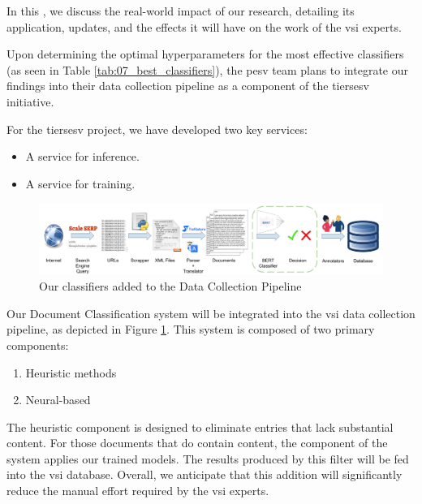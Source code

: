 \label{08_practical_implications}


In this \headerName{}, we discuss the real-world impact of our research, detailing its application, updates, and the effects it will have on the work of the \gls{vsi} experts.

\label{08_overview}


Upon determining the optimal hyperparameters for the most effective classifiers (as seen in Table \ref{tab:07_best_classifiers}), the \gls{pesv} team plans to integrate our findings into their data collection pipeline as a component of the \gls{tiersesv} initiative.

For the \gls{tiersesv} project, we have developed two key services:
\begin{itemize}
\item A service for inference.
\item A service for training.
\end{itemize}



\label{08_inference_service}


\begin{figure}[h]
    \centering
    \includegraphics[width=\textwidth]{Figures/08/08_vsi_dataset_collection_with_classifier.png}
    \caption{Our classifiers added to the \VSI{} Data Collection Pipeline}
    \label{fig:08_vsi_data_collection_pipeline_with_classifier}
\end{figure}

Our Document Classification system will be integrated into the \gls{vsi} data collection pipeline, as depicted in Figure \ref{fig:08_vsi_data_collection_pipeline_with_classifier}. This system is composed of two primary components:
\begin{enumerate}
\item Heuristic methods
\item Neural-based \textclassification{}
\end{enumerate}

The heuristic component is designed to eliminate entries that lack substantial content. For those documents that do contain content, the \textclassification{} component of the system applies our trained models.
The results produced by this filter will be fed into the \gls{vsi} database. Overall, we anticipate that this addition will significantly reduce the manual effort required by the \gls{vsi} experts.

